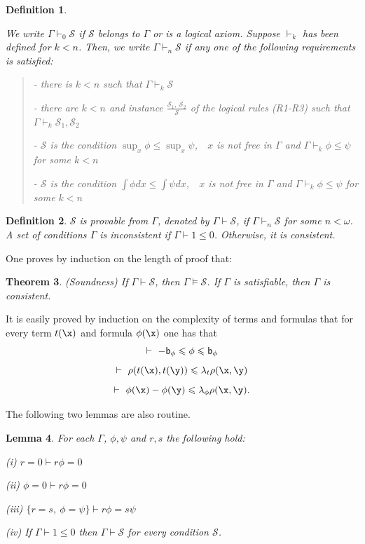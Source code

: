 \documentclass[12pt]{article}
\newtheorem{theorem}{Theorem}[section]
\newtheorem{lemma}[theorem]{Lemma}
\newtheorem{definition}[theorem]{Definition}
\def\Sc{\mathcal S}
\begin{document}
\begin{definition} \label{proofdfn}
{\em We write $\Gamma\vdash_0\Sc$ if $\Sc$ belongs to $\Gamma$ or is a logical axiom.
Suppose $\vdash_k$ has been defined for $k<n$.
Then, we write $\Gamma\vdash_n\Sc$ if any one of the following requirements is satisfied:
\begin{quote}

- there is $k<n$ such that $\Gamma\vdash_k\Sc$

- there are $k<n$ and instance $\frac{\Sc_1,\ \Sc_2}{\Sc}$ of the logical rules (R1-R3)
such that $\Gamma\vdash_k\Sc_1,\Sc_2$

- $\Sc$ is the condition $\sup_x\phi\leqslant\sup_x\psi$,\ \ $x$ is not free
in $\Gamma$ and $\Gamma\vdash_k\phi\leqslant\psi$ for some $k<n$

- $\Sc$ is the condition $\int\phi dx\leqslant\int\psi dx$,\ \ $x$ is not free
in $\Gamma$ and $\Gamma\vdash_k\phi\leqslant\psi$ for some $k<n$

\end{quote}}
\end{definition}

\begin{definition}
{\em  $\Sc$ is \emph{provable} %
from $\Gamma$, denoted by $\Gamma\vdash\Sc$, if $\Gamma\vdash_n\Sc$ for some $n<\omega$.
A set of conditions $\Gamma$ is \emph{inconsistent} if $\Gamma\vdash 1\leqslant 0$.
Otherwise, it is \emph{consistent}.}
\end{definition}

One proves by induction on the length of proof that:

\begin{theorem} \label{soundness} \emph{(Soundness)}
If $\Gamma\vdash\Sc$, then $\Gamma\vDash\Sc$. If $\Gamma$ is satisfiable, then $\Gamma$ is consistent.
\end{theorem}

It is easily proved by induction on the complexity of terms and formulas that for every term
$t(\x)$ and formula $\phi(\x)$ one has that
$$\vdash\ -{\sf b}_\phi\leqslant\phi\leqslant{\sf b}_\phi$$
$$\vdash\ \rho(t(\x),t(\y))\leqslant\lambda_t \rho(\x,\y)$$
$$\vdash\ \phi(\x)-\phi(\y)\leqslant\lambda_\phi \rho(\x,\y).$$

The following two lemmas are also routine.
\begin{lemma} \label{easy consequence}
For each $\Gamma$, $\phi,\psi$ and $r,s$ the following hold:

{\em(i)} $r=0\vdash r\phi=0$

{\em(ii)} $\phi=0\vdash r\phi=0$

{\em(iii)} $\{r=s,\ \phi=\psi\}\vdash r\phi=s\psi$

{\em(iv)} If $\Gamma\vdash 1\leqslant 0$ then  $\Gamma\vdash\Sc$
for every condition $\Sc$.
\end{lemma}
\end{document}
